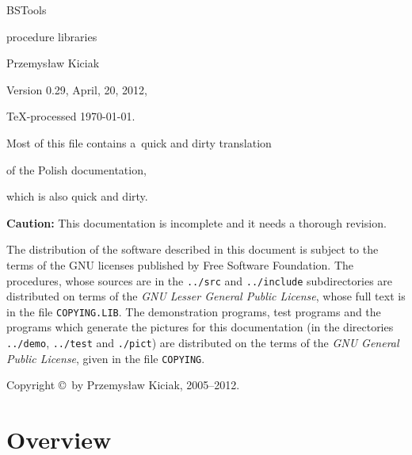 

\thispagestyle{empty}
\vspace*{4.0cm}
\centerline{\Huge BSTools}
\vspace{0.75cm}
\centerline{\Huge procedure libraries}
\vspace{1.0cm}
\centerline{\Large Przemys{\l}aw Kiciak}
\vspace{1.0cm}
\centerline{\large Version 0.29, April, 20, 2012,}
\vspace{\smallskipamount}
\centerline{\large\TeX-processed \today.}

\vspace{1.0cm}
\centerline{Most of this file contains a~quick and dirty translation}
\centerline{of the Polish documentation,}
\centerline{which is also quick and dirty.}

\vspace{1.0cm}
\noindent
\textbf{Caution:} This documentation is incomplete
and it needs a thorough revision.

\newpage
\thispagestyle{empty}
\vspace*{\fill}
\noindent
The distribution of the software described in this document is subject
to the terms of the GNU licenses published by Free Software Foundation.
The procedures, whose sources are in the 
\texttt{../src} and \texttt{../include} subdirectories are distributed
on terms of the \textsl{GNU Lesser General Public License}, whose full text
is in the file \texttt{COPYING.LIB}. The demonstration programs, test programs
and the programs which generate the pictures for this documentation
(in the directories \texttt{../demo}, \texttt{../test} and \texttt{./pict})
are distributed on the terms of the \textsl{GNU General Public License},
given in the file \texttt{COPYING}.

\vspace{\bigskipamount}
\noindent
Copyright \copyright\ by Przemys{\l}aw Kiciak, 2005--2012.

\vspace*{\fill}

\tableofcontents

\chapter{Overview}

